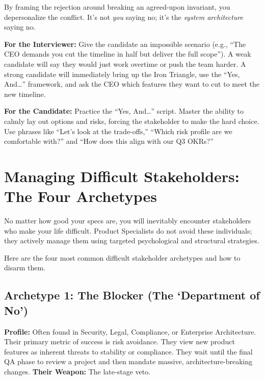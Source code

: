 \documentclass[
  11pt,
  openany,
  oneside]{book}
\renewenvironment{quote}{\begin{customquote}}{\end{customquote}}
\begin{document}
By framing the rejection around breaking an agreed-upon invariant, you
depersonalize the conflict. It's not \emph{you} saying no; it's the
\emph{system architecture} saying no.

\begin{quote}
\textbf{For the Interviewer:} Give the candidate an impossible scenario
(e.g., ``The CEO demands you cut the timeline in half but deliver the
full scope''). A weak candidate will say they would just work overtime
or push the team harder. A strong candidate will immediately bring up
the Iron Triangle, use the ``Yes, And\ldots{}'' framework, and ask the
CEO which features they want to cut to meet the new timeline.
\end{quote}

\begin{quote}
\textbf{For the Candidate:} Practice the ``Yes, And\ldots{}'' script.
Master the ability to calmly lay out options and risks, forcing the
stakeholder to make the hard choice. Use phrases like ``Let's look at
the trade-offs,'' ``Which risk profile are we comfortable with?'' and
``How does this align with our Q3 OKRs?''
\end{quote}

\bigskip

\section{Managing Difficult Stakeholders: The Four
Archetypes}\label{managing-difficult-stakeholders-the-four-archetypes}

No matter how good your specs are, you will inevitably encounter
stakeholders who make your life difficult. Product Specialists do not
avoid these individuals; they actively manage them using targeted
psychological and structural strategies.

Here are the four most common difficult stakeholder archetypes and how
to disarm them.

\subsection{Archetype 1: The Blocker (The `Department of
No')}\label{archetype-1-the-blocker-the-department-of-no}

\textbf{Profile:} Often found in Security, Legal, Compliance, or
Enterprise Architecture. Their primary metric of success is risk
avoidance. They view new product features as inherent threats to
stability or compliance. They wait until the final QA phase to review a
project and then mandate massive, architecture-breaking changes.
\textbf{Their Weapon:} The late-stage veto.
\end{document}
